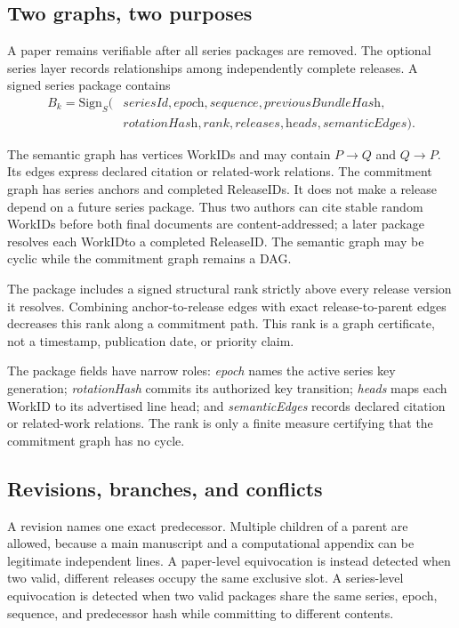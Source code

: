 \documentclass[11pt]{article}
\newcommand{\workid}{\textsf{WorkID}}
\newcommand{\releaseid}{\textsf{ReleaseID}}
\begin{document}
\subsection{Two graphs, two purposes}

A paper remains verifiable after all series packages are removed. The optional series layer records relationships among independently complete releases. A signed series package contains
\[
\begin{aligned}
  B_k = \mathrm{Sign}_{S}(&\textit{seriesId},\textit{epoch},\textit{sequence},\textit{previousBundleHash},\\
                           &\textit{rotationHash},\textit{rank},\textit{releases},\textit{heads},\textit{semanticEdges}).
\end{aligned}
\]

The semantic graph has vertices \workid s and may contain $P \rightarrow Q$ and $Q \rightarrow P$. Its edges express declared citation or related-work relations. The commitment graph has series anchors and completed \releaseid s. It does not make a release depend on a future series package. Thus two authors can cite stable random \workid s before both final documents are content-addressed; a later package resolves each \workid to a completed \releaseid. The semantic graph may be cyclic while the commitment graph remains a DAG.

The package includes a signed structural rank strictly above every release version it resolves. Combining anchor-to-release edges with exact release-to-parent edges decreases this rank along a commitment path. This rank is a graph certificate, not a timestamp, publication date, or priority claim.

The package fields have narrow roles: \textit{epoch} names the active series
key generation; \textit{rotationHash} commits its authorized key transition;
\textit{heads} maps each WorkID to its advertised line head; and
\textit{semanticEdges} records declared citation or related-work relations.
The rank is only a finite measure certifying that the commitment graph has no
cycle.

\subsection{Revisions, branches, and conflicts}

A revision names one exact predecessor. Multiple children of a parent are allowed, because a main manuscript and a computational appendix can be legitimate independent lines. A paper-level equivocation is instead detected when two valid, different releases occupy the same exclusive slot. A series-level equivocation is detected when two valid packages share the same series, epoch, sequence, and predecessor hash while committing to different contents.
\end{document}
